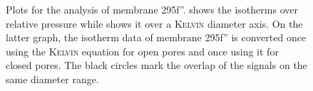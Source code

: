\documentclass[../../../thesis.tex]{subfiles}
\begin{document}
\begin{figure}[tpb]
{
      \label{fig:295-f-200ald-kelvin}
    }
    \caption{Plots for the analysis of membrane 295f''. \protect{} shows the isotherms over relative pressure while \protect{} shows it over a \textsc{Kelvin} diameter axis. On the latter graph, the isotherm data of membrane 295f'' is converted once using the \textsc{Kelvin} equation for open pores and once using it for closed pores. The black circles mark the overlap of the signals on the same diameter range. }
    \label{fig:295f-200ald}
  \end{figure}
\end{document}
